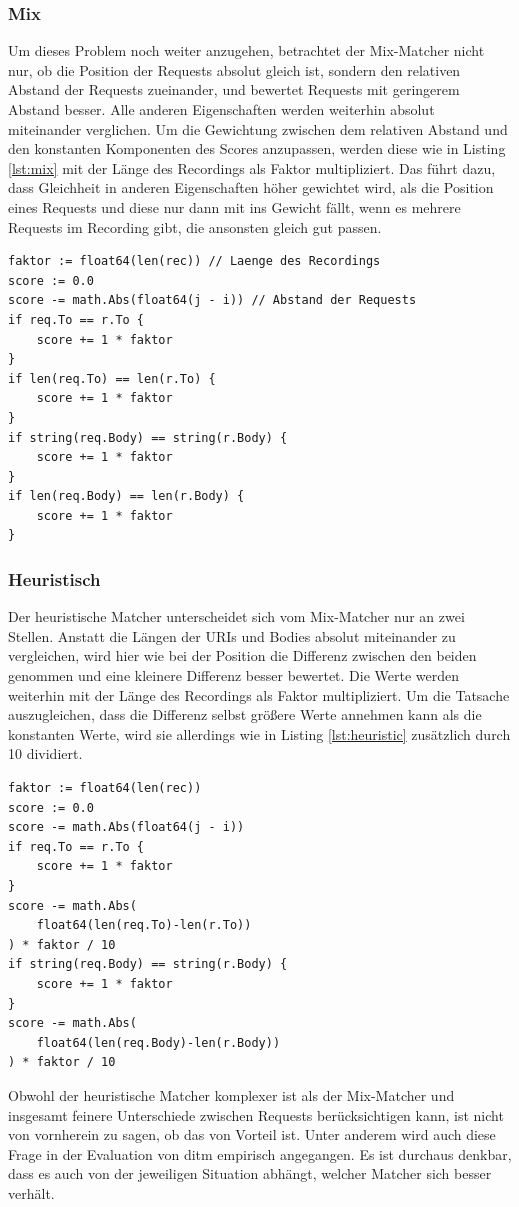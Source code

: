 \documentclass[12pt,a4paper]{report}
\begin{document}
\subsubsection{Mix}
Um dieses Problem noch weiter anzugehen, betrachtet der Mix-Matcher nicht nur, ob die Position der Requests absolut gleich ist,
sondern den relativen Abstand der Requests zueinander, und bewertet Requests mit geringerem Abstand besser. Alle anderen
Eigenschaften werden weiterhin absolut miteinander verglichen. Um die Gewichtung zwischen dem relativen Abstand und den
konstanten Komponenten des Scores anzupassen, werden diese wie in Listing \ref{lst:mix} mit der Länge des Recordings als Faktor
multipliziert.  Das führt dazu, dass Gleichheit in anderen Eigenschaften höher gewichtet wird, als die Position eines Requests und
diese nur dann mit ins Gewicht fällt, wenn es mehrere Requests im Recording gibt, die ansonsten gleich gut passen.
\begin{lstlisting}[caption={Scoring Code für den Mix-Matcher}, label={lst:mix}]
faktor := float64(len(rec)) // Laenge des Recordings
score := 0.0
score -= math.Abs(float64(j - i)) // Abstand der Requests
if req.To == r.To {
    score += 1 * faktor
}
if len(req.To) == len(r.To) {
    score += 1 * faktor
}
if string(req.Body) == string(r.Body) {
    score += 1 * faktor
}
if len(req.Body) == len(r.Body) {
    score += 1 * faktor
}
\end{lstlisting}

\subsubsection{Heuristisch}
Der heuristische Matcher unterscheidet sich vom Mix-Matcher nur an zwei Stellen. Anstatt die Längen der URIs und Bodies
absolut miteinander zu vergleichen, wird hier wie bei der Position die Differenz zwischen den beiden genommen und eine kleinere
Differenz besser bewertet. Die Werte werden weiterhin mit der Länge des Recordings als Faktor multipliziert. Um die Tatsache
auszugleichen, dass die Differenz selbst größere Werte annehmen kann als die konstanten Werte, wird sie allerdings wie in Listing
\ref{lst:heuristic} zusätzlich durch 10 dividiert.
\begin{lstlisting}[caption={Scoring Code für den Heutristischen Matcher}, label={lst:heuristic}]
faktor := float64(len(rec))
score := 0.0
score -= math.Abs(float64(j - i))
if req.To == r.To {
    score += 1 * faktor
}
score -= math.Abs(
    float64(len(req.To)-len(r.To))
) * faktor / 10
if string(req.Body) == string(r.Body) {
    score += 1 * faktor
}
score -= math.Abs(
    float64(len(req.Body)-len(r.Body))
) * faktor / 10
\end{lstlisting}
Obwohl der heuristische Matcher komplexer ist als der Mix-Matcher und insgesamt feinere Unterschiede zwischen Requests
berücksichtigen kann, ist nicht von vornherein zu sagen, ob das von Vorteil ist. Unter anderem wird auch diese Frage in
der Evaluation von ditm empirisch angegangen. Es ist durchaus denkbar, dass es auch von der jeweiligen Situation abhängt,
welcher Matcher sich besser verhält.
\end{document}
